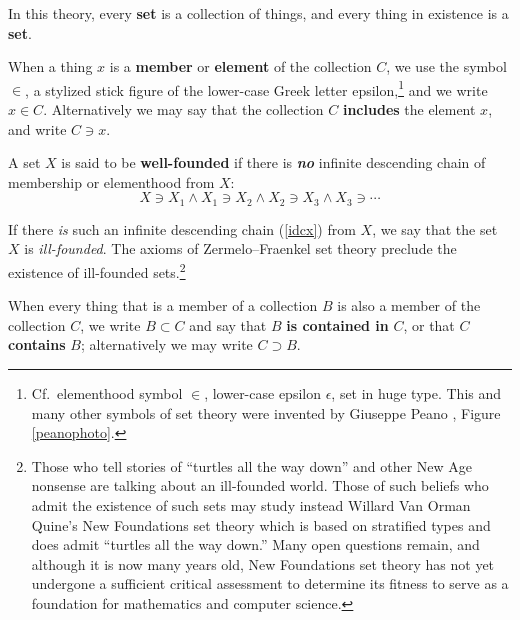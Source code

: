 \documentclass[letterpaper]{article}
\begin{document}
\begin{definition}\label{def-set}
	In this theory, every \textbf{set} is a collection of things, and every thing in existence is a \textbf{set}.
\end{definition}
\begin{definition}
	When a thing $x$ is a \textbf{member} or \textbf{element} of the collection $C$, we use the symbol $\in$, a stylized stick figure of the lower-case Greek letter epsilon,\footnote{Cf.\ elementhood symbol {\huge$\in$}, lower-case epsilon {\huge$\epsilon$}, set in huge type.  This and many other symbols of set theory were invented by Giuseppe Peano \cite{peano1901}, Figure \ref{peanophoto}.} and we write \mbox{$x\in C$}.  Alternatively we may say that the collection $C$ \textbf{includes} the element $x$, and write \mbox{$C\ni x$}.
\end{definition}
\begin{definition}\label{def-well-founded}
	A set $X$ is said to be \textbf{well-founded} if there is \textbf{\textit{no}} infinite descending chain of membership or elementhood from $X$:
	\begin{equation}
	X\ni X_1
	\land X_1\ni X_2
	\land X_2\ni X_3
	\land X_3\ni \cdots\label{idcx}
	\end{equation}
\end{definition}
\begin{remark}
	If there \textit{is} such an infinite descending chain (\ref{idcx}) from $X$, we say that the set $X$ is \textit{ill-founded}.  The axioms of Zermelo--Fraenkel set theory preclude the existence of ill-founded sets.\footnote{Those who tell stories of ``turtles all the way down'' and other New Age nonsense are talking about an ill-founded world.  Those of such beliefs who admit the existence of such sets may study instead Willard Van Orman Quine's New Foundations set theory \cite{sep-quine-nf} which is based on stratified types and does admit ``turtles all the way down.''  Many open questions remain, and although it is now many years old, New Foundations set theory has not yet undergone a sufficient critical assessment to determine its fitness to serve as a foundation for mathematics and computer science.}
\end{remark}
\begin{definition}
	When every thing that is a member of a collection $B$ is also a member of the collection $C$, we write \mbox{$B\subset C$} and say that $B$ \textbf{is contained in} $C$, or that $C$ \textbf{contains} $B$; alternatively we may write \mbox{$C\supset B$}.
\end{definition}
\end{document}
